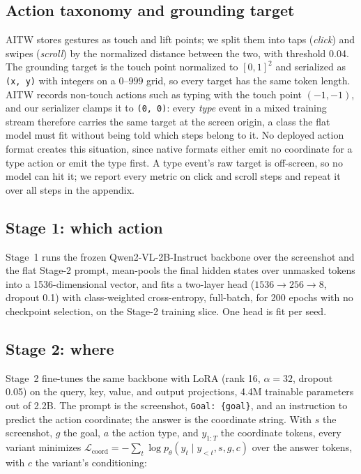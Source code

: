 \documentclass[letterpaper]{article} %
\begin{document}
\subsection{Action taxonomy and grounding target}
AITW stores gestures as touch and lift points; we split them into taps (\emph{click}) and swipes (\emph{scroll}) by the normalized distance between the two, with threshold 0.04. The grounding target is the touch point normalized to $[0,1]^2$ and serialized as \texttt{(x, y)} with integers on a $0$--$999$ grid, so every target has the same token length. AITW records non-touch actions such as typing with the touch point $(-1,-1)$, and our serializer clamps it to \texttt{(0, 0)}: every \emph{type} event in a mixed training stream therefore carries the same target at the screen origin, a class the flat model must fit without being told which steps belong to it. No deployed action format creates this situation, since native formats either emit no coordinate for a type action or emit the type first. A type event's raw target is off-screen, so no model can hit it; we report every metric on click and scroll steps and repeat it over all steps in the appendix.

\subsection{Stage 1: which action}
Stage~1 runs the frozen Qwen2-VL-2B-Instruct backbone over the screenshot and the flat Stage-2 prompt, mean-pools the final hidden states over unmasked tokens into a 1536-dimensional vector, and fits a two-layer head ($1536 \to 256 \to 8$, dropout 0.1) with class-weighted cross-entropy, full-batch, for 200 epochs with no checkpoint selection, on the Stage-2 training slice. One head is fit per seed.

\subsection{Stage 2: where}
Stage~2 fine-tunes the same backbone with LoRA (rank 16, $\alpha=32$, dropout 0.05) on the query, key, value, and output projections, 4.4M trainable parameters out of 2.2B. The prompt is the screenshot, \texttt{Goal: \{goal\}}, and an instruction to predict the action coordinate; the answer is the coordinate string. With $s$ the screenshot, $g$ the goal, $a$ the action type, and $y_{1:T}$ the coordinate tokens, every variant minimizes $\mathcal{L}_{\mathrm{coord}} = -\sum_{t} \log p_\theta(y_t \mid y_{<t}, s, g, c)$ over the answer tokens, with $c$ the variant's conditioning:
\end{document}
